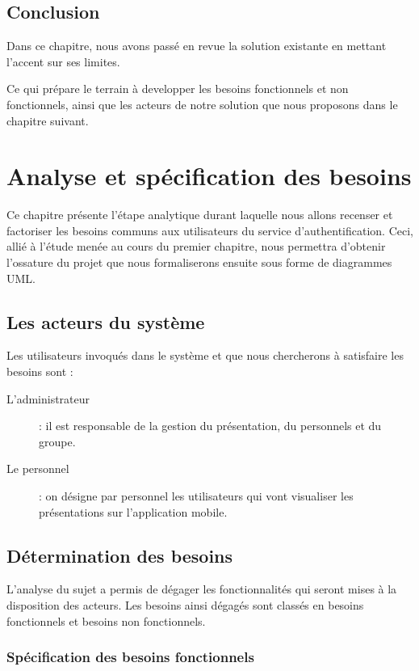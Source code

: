 \documentclass[12pt, ChapStyle1, oneside]{./Styles/Dea_Gsm}
\begin{document}
\section{Conclusion}
Dans ce chapitre, nous avons passé en revue la solution existante en mettant l’accent sur ses limites.


Ce qui prépare le terrain à developper les besoins fonctionnels et non fonctionnels, ainsi que les acteurs de notre solution que nous proposons dans le chapitre suivant.
\chapter{Analyse et spécification des besoins}
\vspace*{3cm}
Ce chapitre présente l'étape analytique durant laquelle nous allons recenser et factoriser les besoins communs aux utilisateurs du service d’authentification. Ceci, allié à l’étude menée au cours du premier chapitre, nous permettra d’obtenir l'ossature du projet que nous formaliserons ensuite sous forme de diagrammes UML.
\pagebreak
\section{Les acteurs du système}
Les utilisateurs invoqués dans le système et que nous chercherons à satisfaire les besoins sont :
\begin{description}
    \item [L’administrateur] : il est responsable de la gestion du présentation, du personnels et du groupe.
    \item [Le personnel] : on désigne par personnel les utilisateurs qui vont visualiser les présentations sur l'application mobile.
\end{description}
\section{Détermination des besoins}
L’analyse du sujet a permis de dégager les fonctionnalités qui seront mises à la disposition des acteurs. Les besoins ainsi dégagés sont classés en besoins fonctionnels et besoins non fonctionnels.
\subsection{Spécification des besoins fonctionnels}
\end{document}
